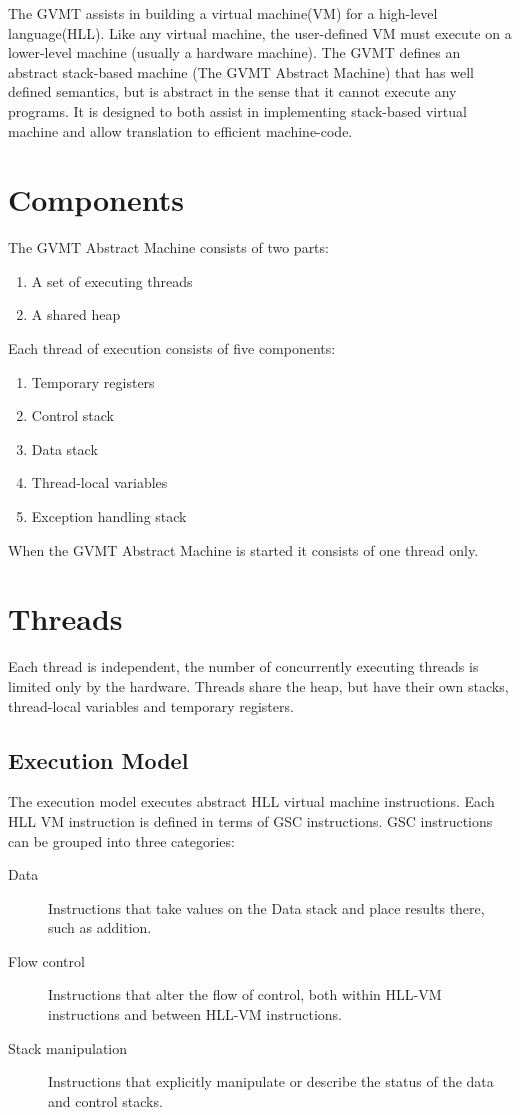 
The GVMT assists in building a virtual machine(VM) for a high-level language(HLL). 
Like any virtual machine, the user-defined VM must execute on a lower-level machine (usually a hardware machine). The GVMT defines an abstract stack-based machine (The GVMT Abstract Machine) that has well defined semantics, but is abstract in the sense that it cannot execute any programs. It is designed to both assist in implementing stack-based virtual machine and allow translation to efficient machine-code.

\section{Components}
The GVMT Abstract Machine consists of two parts:

\begin{enumerate}
\item A set of executing threads
\item A shared heap
\end{enumerate}

Each thread of execution consists of five components:
\begin{enumerate}
\item Temporary registers
\item Control stack
\item Data stack
\item Thread-local variables
\item Exception handling stack
\end{enumerate}

When the GVMT Abstract Machine is started it consists of one thread only.

\section{Threads}
Each thread is independent, the number of concurrently executing threads is limited only by the hardware. Threads share the heap, but have their own stacks, thread-local variables and temporary registers.

\subsection{Execution Model}
The execution model executes abstract HLL virtual machine instructions. Each HLL VM instruction is defined in terms of GSC instructions.
GSC instructions can be grouped into three categories:
\begin{description}
\item[Data] Instructions that take values on the Data stack and place results there, such as addition.
\item[Flow control] Instructions that alter the flow of control, both within HLL-VM instructions and between HLL-VM instructions.
\item[Stack manipulation] Instructions that explicitly manipulate or describe the status of the data and control stacks.
\end{description}

